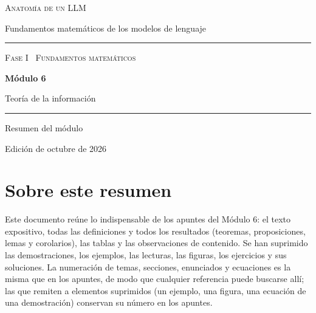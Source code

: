 \documentclass[11pt,a4paper,twoside,openany]{book}
\begin{document}
\frontmatter
\begin{titlepage}
\centering
\vspace*{2.5cm}
{\large\scshape Anatomía de un LLM}\par
\vspace{0.4cm}
{\normalsize Fundamentos matemáticos de los modelos de lenguaje}\par
\vspace{2.2cm}
\rule{\textwidth}{0.8pt}\par\vspace{0.5cm}
{\small\scshape Fase I \textperiodcentered\ Fundamentos matemáticos}\par\vspace{0.3cm}
{\Huge\bfseries Módulo 6\par}\vspace{0.3cm}
{\LARGE Teoría de la información\par}
\vspace{0.5cm}\rule{\textwidth}{0.4pt}\par
\vspace{1.6cm}
{\large Resumen del módulo}\par
\vfill
{\small Edición de octubre de 2026}\par
\end{titlepage}

\chapter*{Sobre este resumen}

Este documento reúne lo indispensable de los apuntes del Módulo 6: el texto expositivo, todas las definiciones y todos los resultados (teoremas, proposiciones, lemas y corolarios), las tablas y las observaciones de contenido. Se han suprimido las demostraciones, los ejemplos, las lecturas, las figuras, los ejercicios y sus soluciones. La numeración de temas, secciones, enunciados y ecuaciones es la misma que en los apuntes, de modo que cualquier referencia puede buscarse allí; las que remiten a elementos suprimidos (un ejemplo, una figura, una ecuación de una demostración) conservan su número en los apuntes.
\end{document}
